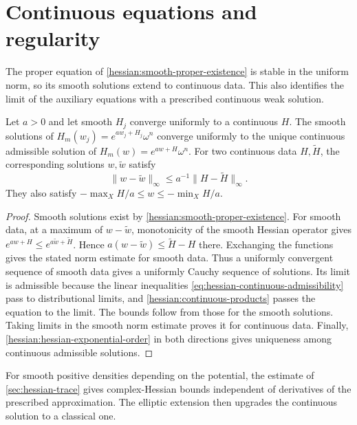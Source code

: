 \section{Continuous equations and regularity}
\label{sec:hessian-continuous-regularity}

The proper equation of \cref{hessian:smooth-proper-existence} is stable
in the uniform norm, so its smooth solutions extend to continuous data.
This also identifies the limit of the auxiliary equations with a
prescribed continuous weak solution.

\begin{proposition}\label{hessian:proper-uniform-stability}
Let $a>0$ and let smooth $H_j$ converge uniformly to a continuous
$H$. The smooth solutions of $H_m(w_j)=e^{aw_j+H_j}\omega^n$
converge uniformly to the unique continuous admissible solution of
$H_m(w)=e^{aw+H}\omega^n$. For two continuous data $H,\widetilde H$,
the corresponding solutions $w,\widetilde w$ satisfy
\[
 \|w-\widetilde w\|_\infty\leq a^{-1}\|H-\widetilde H\|_\infty.
\]
They also satisfy
$-\max_XH/a\leq w\leq-\min_XH/a$.
\end{proposition}
\begin{proof}
Smooth solutions exist by \cref{hessian:smooth-proper-existence}.
For smooth data, at a maximum of $w-\widetilde w$, monotonicity of the
smooth Hessian operator gives
$e^{aw+H}\leq e^{a\widetilde w+\widetilde H}$. Hence
$a(w-\widetilde w)\leq\widetilde H-H$ there. Exchanging the functions
gives the stated norm estimate for smooth data. Thus a uniformly
convergent sequence of smooth data gives a uniformly Cauchy
sequence of solutions. Its limit is admissible because the linear
inequalities \eqref{eq:hessian-continuous-admissibility} pass to
distributional limits, and \cref{hessian:continuous-products}
passes the equation to the limit. The bounds follow from those
for the smooth solutions. Taking limits in the smooth norm estimate
proves it for continuous data. Finally,
\cref{hessian:hessian-exponential-order} in both directions gives
uniqueness among continuous admissible solutions.
\end{proof}

For smooth positive densities depending on the potential, the estimate
of \cref{sec:hessian-trace} gives complex-Hessian bounds independent of
derivatives of the prescribed approximation. The elliptic extension then
upgrades the continuous solution to a classical one.


